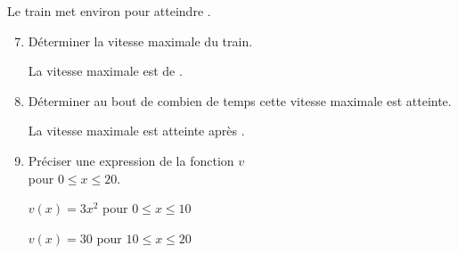 \begin{corrige}
\begin{enumerate}
        {\red Le train met environ  pour atteindre .}
    \end{enumerate}
    \Coupe
    \begin{enumerate}
        \setcounter{enumi}{6}
        \item Déterminer la vitesse maximale du train.
        
        {\red La vitesse maximale est de .}
        \item Déterminer au bout de combien de temps cette vitesse maximale est atteinte.
        
        {\red La vitesse maximale est atteinte après .}
        \item Préciser une expression de la fonction $v$\\pour $0 \leq x \leq 20$.
        
        {\red $v(x)=3x^2$ pour $0 \leq x \leq 10$
        
        $v(x)=30$ pour $10 \leq x \leq 20$}
    \end{enumerate}
    \vspace*{-9mm}
\end{corrige}
